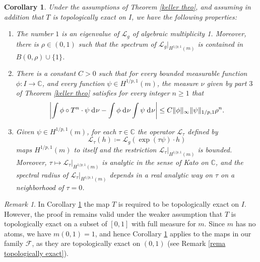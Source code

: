 \documentclass[12pt]{amsart}
\numberwithin{equation}{section} %
\numberwithin{figure}{section} %
\theoremstyle{plain}
\newtheorem{coro}[prop]{Corollary}
\theoremstyle{definition}
\theoremstyle{remark}
\newtheorem{rema}[prop]{Remark}
\theoremstyle{citing}
\newcommand{\C}{\mathbb{C}}
\renewcommand{\=}{\coloneqq}
\newcommand{\dd}{\hspace{1pt}\operatorname{d}\hspace{-1pt}}
\begin{document}
\begin{coro}\label{corollary keller theo}
    Under the assumptions of Theorem \ref{keller theo}, and  assuming in addition that $T$ is topologically exact on $I$, we have the following properties:
\begin{enumerate}
    \item[1.] The number $1$ is an eigenvalue of $\mathscr{L}_g$ of algebraic multiplicity 1. Moreover, there is $\rho \in (0,1)$ such that the spectrum of $\mathscr{L}_g|_{H^{1/p,1}(m)}$ is contained in $B(0,\rho)\cup \{1\}$.
    \item[2.] There is a constant $C>0$ such that for every bounded measurable function $\phi: I\to\C$, and every function $\psi \in H^{1/p ,1}(m)$, the measure $\nu$ given by part $3$ of Theorem \ref{keller theo} satisfies for every integer $n\geq 1$ that
    \begin{equation*}
       \left| \int \phi\circ T^n \cdot \psi \dd\nu - \int \phi \dd\nu\int \psi \dd\nu \right|\leq C\lVert \phi \rVert_{\infty}\lVert \psi\rVert_{1/p,1}\rho^n.
    \end{equation*}
    \item[3.] Given $\psi \in H^{1/p,1}(m)$, for each $\tau\in \C $ the operator $\mathscr{L}_{\tau}$ defined by
    \begin{equation*}
        \mathscr{L}_{\tau}(h) \= \mathscr{L}_g(\exp(\tau\psi)\cdot h)
    \end{equation*}
    maps $H^{1/p,1}(m)$ to itself and the restriction $\mathscr{L}_{\tau}|_{H^{1/p,1}(m)}$ is bounded. Moreover, $\tau\mapsto \mathscr{L}_{\tau}|_{H^{1/p,1}(m)}$ is analytic in the sense of Kato on $\C$, and the spectral radius of $\mathscr{L}_{\tau}|_{H^{1/p,1}(m)}$ depends in a real analytic way on $\tau$ on a neighborhood of $\tau=0$.
\end{enumerate}
\end{coro}

\begin{rema}
    In Corollary \ref{corollary keller theo} the map $T$ is required to be topologically exact on $I$. However, the proof in \cite{Juan1} remains valid under the weaker assumption that $T$ is topologically exact on a subset of 
    $[0,1]$ with full measure for $m$. Since $m$ has no atoms, we have $m(0,1)=1$, and hence Corollary \ref{corollary keller theo} applies to the maps in our family $\mathscr{F}$, as they are topologically exact on $(0,1)$ (see Remark \ref{rema topologically exact}).
\end{rema}
\end{document}

